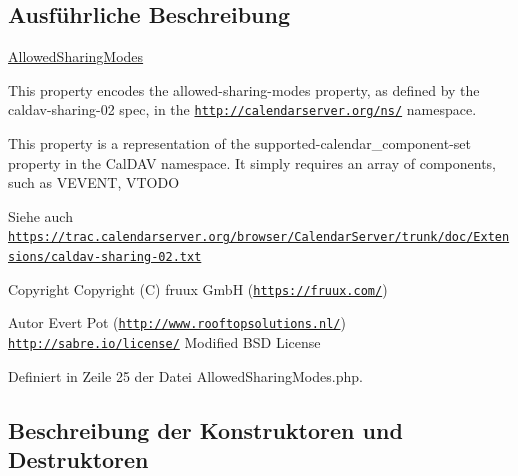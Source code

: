 \subsection{Ausführliche Beschreibung}
\mbox{\hyperlink{class_sabre_1_1_cal_d_a_v_1_1_xml_1_1_property_1_1_allowed_sharing_modes}{Allowed\+Sharing\+Modes}}

This property encodes the \textquotesingle{}allowed-\/sharing-\/modes\textquotesingle{} property, as defined by the \textquotesingle{}caldav-\/sharing-\/02\textquotesingle{} spec, in the \href{http://calendarserver.org/ns/}{\tt http\+://calendarserver.\+org/ns/} namespace.

This property is a representation of the supported-\/calendar\+\_\+component-\/set property in the Cal\+D\+AV namespace. It simply requires an array of components, such as V\+E\+V\+E\+NT, V\+T\+O\+DO

\begin{DoxySeeAlso}{Siehe auch}
\href{https://trac.calendarserver.org/browser/CalendarServer/trunk/doc/Extensions/caldav-sharing-02.txt}{\tt https\+://trac.\+calendarserver.\+org/browser/\+Calendar\+Server/trunk/doc/\+Extensions/caldav-\/sharing-\/02.\+txt} 
\end{DoxySeeAlso}
\begin{DoxyCopyright}{Copyright}
Copyright (C) fruux GmbH (\href{https://fruux.com/}{\tt https\+://fruux.\+com/}) 
\end{DoxyCopyright}
\begin{DoxyAuthor}{Autor}
Evert Pot (\href{http://www.rooftopsolutions.nl/}{\tt http\+://www.\+rooftopsolutions.\+nl/})  \href{http://sabre.io/license/}{\tt http\+://sabre.\+io/license/} Modified B\+SD License 
\end{DoxyAuthor}


Definiert in Zeile 25 der Datei Allowed\+Sharing\+Modes.\+php.



\subsection{Beschreibung der Konstruktoren und Destruktoren}
\mbox{\label{class_sabre_1_1_cal_d_a_v_1_1_xml_1_1_property_1_1_allowed_sharing_modes_a4faf165cd45bfb74139c0a1dd925c493}} 

